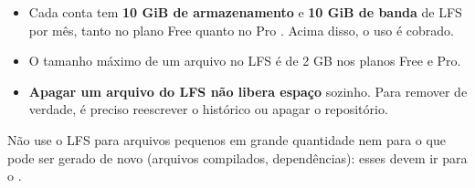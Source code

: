 \begin{itemize}
  \item Cada conta tem \textbf{10 GiB de armazenamento} e \textbf{10 GiB de
        banda} de LFS por mês, tanto no plano Free quanto no Pro
        \cite{github_lfs_uso}. Acima disso, o uso é cobrado.
  \item O tamanho máximo de um arquivo no LFS é de 2 GB nos planos Free e
        Pro.
  \item \textbf{Apagar um arquivo do LFS não libera espaço} sozinho. Para
        remover de verdade, é preciso reescrever o histórico ou apagar o
        repositório.
\end{itemize}

\begin{dica}
Não use o LFS para arquivos pequenos em grande quantidade nem para o que pode
ser gerado de novo (arquivos compilados, dependências): esses devem ir para o
.
\end{dica}
